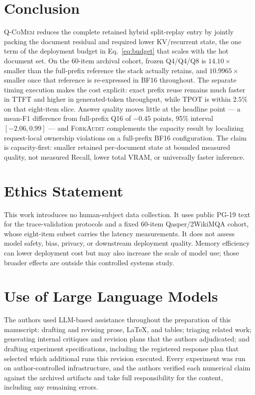 \documentclass{article}
\newcommand{\qcomem}{\textsc{Q-CoMem}}
\newcommand{\method}{\textsc{ForkAudit}}
\begin{document}
\FloatBarrier

\section{Conclusion}

\qcomem{} reduces the complete retained hybrid split-replay entry by jointly
packing the document residual and required lower KV/recurrent state, the one
term of the deployment budget in Eq.~\ref{eq:budget} that scales with the hot
document set.  On the 60-item archival cohort, frozen Q4/Q4/Q8 is
$14.10\times$ smaller than the full-prefix reference the stack actually
retains, and $10.9965\times$ smaller once that reference is re-expressed in
BF16 throughout.  The separate timing execution makes the cost explicit: exact
prefix reuse remains much faster in TTFT and higher in generated-token
throughput, while TPOT is within $2.5\%$ on that eight-item slice.  Answer
quality moves little at the headline point --- a mean-F1 difference from
full-prefix Q16 of $-0.45$ points, 95\% interval $[-2.06,0.99]$ --- and
\method{} complements the capacity result by localizing request-local ownership
violations on a full-prefix BF16 configuration.  The claim is capacity-first:
smaller retained per-document state at bounded measured quality, not measured
Recall, lower total VRAM, or universally faster inference.

\section*{Ethics Statement}
This work introduces no human-subject data collection. It uses public PG-19
text for the trace-validation protocols and a fixed 60-item Qasper/2WikiMQA
cohort, whose eight-item subset carries the latency measurements. It does not
assess model safety, bias, privacy, or downstream deployment quality. Memory
efficiency can lower deployment cost but may also increase the scale of model
use; those broader effects are outside this controlled systems study.

\section*{Use of Large Language Models}
The authors used LLM-based assistance throughout the preparation of this
manuscript: drafting and revising prose, LaTeX, and tables; triaging related
work; generating internal critiques and revision plans that the authors
adjudicated; and drafting experiment specifications, including the registered
response plan that selected which additional runs this revision executed. Every
experiment was run on author-controlled infrastructure, and the authors verified
each numerical claim against the archived artifacts and take full responsibility
for the content, including any remaining errors.
\end{document}
